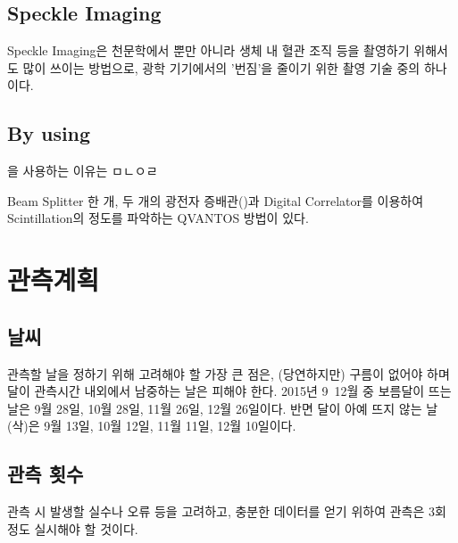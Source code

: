 \documentclass[11pt]{article}
\begin{document}
\subsection{Speckle Imaging} \label{speckle_img}

Speckle Imaging은 천문학에서 뿐만 아니라 생체 내 혈관 조직 등을 촬영하기 위해서도 많이 쓰이는 방법으로, 광학 기기에서의 '번짐'을 줄이기 위한 촬영 기술 중의 하나이다. \cite{speckle_img}

\subsection{By using \PM} \label{photomultiplier}

\PM 을 사용하는 이유는 ㅁㄴㅇㄹ\cite{paterno}

Beam Splitter 한 개, 두 개의 광전자 증배관(\PM)과 Digital Correlator를 이용하여 Scintillation의 정도를 파악하는 QVANTOS 방법이 있다. \cite{AISS.1} 


\section{관측계획}
\subsection{날씨}

관측할 날을 정하기 위해 고려해야 할 가장 큰 점은, (당연하지만) 구름이 없어야 하며 달이 관측시간 내외에서 남중하는 날은 피해야 한다. 2015년 9~12월 중 보름달이 뜨는 날은 9월 28일, 10월 28일, 11월 26일, 12월 26일이다. 반면 달이 아예 뜨지 않는 날(삭)은 9월 13일, 10월 12일, 11월 11일, 12월 10일이다.

\subsection{관측 횟수}

관측 시 발생할 실수나 오류 등을 고려하고, 충분한 데이터를 얻기 위하여 관측은 3회정도 실시해야 할 것이다.
\end{document}
